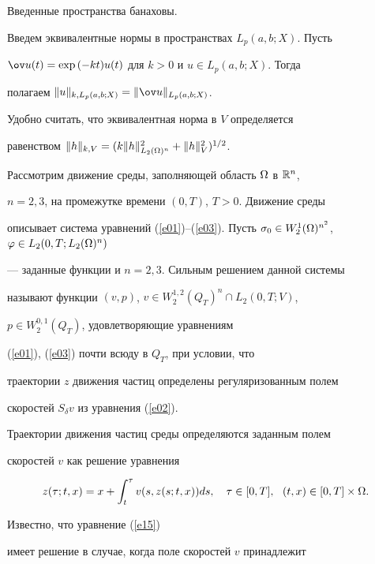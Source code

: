 Введенные пространства банаховы.





Введем эквивалентные нормы в пространствах $L_p(a,b;X)$. Пусть


$\ov u(t)=\exp{(-kt)}u(t)$ для $k{>}0$ и $u\in L_p(a,b;X)$. Тогда


полагаем $\|u\|_{k,L_p(a,b;X)}=\|\ov u\|_{L_p(a,b;X)}$.


Удобно считать, что эквивалентная норма в $V$ определяется


равенством $\|h\|_{k,V}=(k\|h\|_{L_2(\Omega)^n}^2+\|h\|_V^2)^{1/2}$.





Рассмотрим движение среды, заполняющей область $\Omega$ в $\Bbb R^n$,


$n=2,3$, на промежутке времени $(0,T)$, $T>0$. Движение среды


описывает система уравнений (\ref{e01})--(\ref{e03}). Пусть $\sig_0


\in W_2^{1}(\Om)^{n^2}$, $\varphi\in L_2(0,T;L_2(\Om)^n)$


--- заданные функции и $n=2,3$. Сильным решением данной системы


называют функции $(v,p)$, $v\in W_2^{1,2}(Q_T)^n\cap L_2(0,T;V)$,


$p\in W_2^{0,1}(Q_T)$, удовлетворяющие уравнениям


(\ref{e01}), (\ref{e03}) почти всюду в $Q_T$, при условии, что


траектории $z$ движения частиц определены регуляризованным полем


скоростей $S_{\delta}v$ из уравнения (\ref{e02}).





Траектории движения частиц среды определяются заданным полем


скоростей $v$ как решение уравнения


\begin{equation}\label{e15}


z(\tau;t,x)=x+\int_t^\tau v(s,z(s;t,x))ds,\quad \tau\in[0,T],


\ \ (t,x)\in[0,T]\times \Om.


\end{equation}


Известно, что уравнение (\ref{e15})


имеет решение в случае, когда поле скоростей $v$ принадлежит


